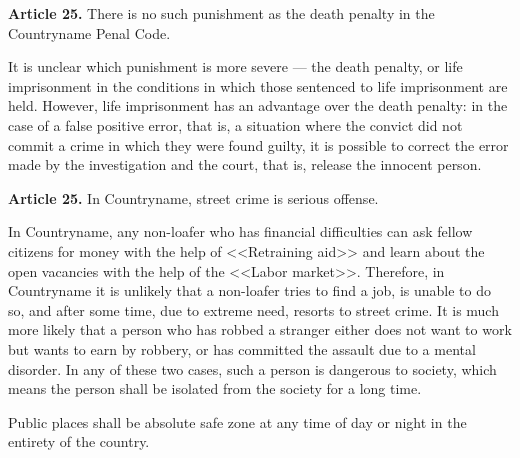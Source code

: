 \documentclass[11pt]{article}
\theoremstyle{remark}
\theoremstyle{definition}
\begin{document}
\color{black}
















\textbf{Article 25.} There is no such punishment as the death penalty in the Countryname Penal Code.

\color{blue}

It is unclear which punishment is more severe --- the death penalty, or life imprisonment in the conditions in which those sentenced to life imprisonment are held. However, life imprisonment has an advantage over the death penalty: in the case of a false positive error, that is, a situation where the convict did not commit a crime in which they were found guilty, it is possible to correct the error made by the investigation and the court, that is, release the innocent person.



\color{black}





\textbf{Article 25.} In Countryname, street crime is serious offense.

\color{blue}



In Countryname, any non-loafer who has financial difficulties can ask fellow citizens for money with the help of <<Retraining aid>> and learn about the open vacancies with the help of the <<Labor market>>. Therefore, in Countryname it is unlikely that a non-loafer tries to find a job, is unable to do so, and after some time, due to extreme need, resorts to street crime. It is much more likely that a person who has robbed a stranger either does not want to work but wants to earn by robbery, or has committed the assault due to a mental disorder. In any of these two cases, such a person is dangerous to society, which means the person shall be isolated from the society for a long time.


Public places shall be absolute safe zone at any time of day or night in the entirety of the country.
 

 


\color{black}
\end{document}
